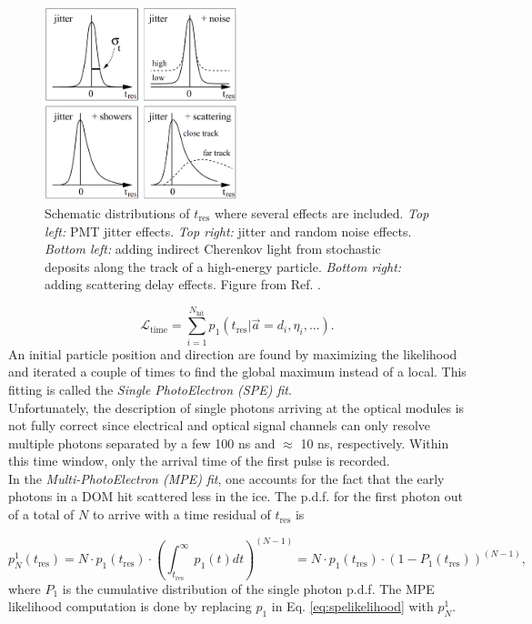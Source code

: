 \begin{figure}[t]
\centering
\includegraphics[width=0.5\textwidth]{chapter7/img/spempejitter.png}
\caption{Schematic distributions of $t_\textrm{res}$ where several effects are included. \textit{Top left: }PMT jitter effects. \textit{Top right: }jitter and random noise effects. \textit{Bottom left: }adding indirect Cherenkov light from stochastic deposits along the track of a high-energy particle. \textit{Bottom right: }adding scattering delay effects. Figure from Ref. \cite{Ahrens:2003fg}.}
\end{figure}

\begin{equation}
\label{eq:spelikelihood}
\mathcal{L}_\textrm{time} = \sum^{N_\textrm{hit}}_{i=1} p_1 (t_\textrm{res} | \vec{a} = {d_i,\eta_i,...}).
\end{equation}
\noindent An initial particle position and direction are found by maximizing the likelihood and iterated a couple of times to find the global maximum instead of a local. This fitting is called the \textit{Single PhotoElectron (SPE) fit}.\\

\noindent Unfortunately, the description of single photons arriving at the optical modules is not fully correct since electrical and optical signal channels can only resolve multiple photons separated by a few 100 ns and $\approx$ 10 ns, respectively. Within this time window, only the arrival time of the first pulse is recorded.\\

\noindent In the \textit{Multi-PhotoElectron (MPE) fit}, one accounts for the fact that the early photons in a DOM hit scattered less in the ice. The p.d.f. for the first photon out of a total of $N$ to arrive with a time residual of $t_\textrm{res}$ is

\begin{equation}
p^1_N (t_\textrm{res}) = N \cdot p_1(t_\textrm{res}) \cdot \left(\int^\infty_{t_\textrm{res}} p_1(t) dt \right)^{(N-1)} = N \cdot p_1 (t_\textrm{res}) \cdot (1-P_1 (t_\textrm{res}))^{(N-1)},
\end{equation}
\noindent where $P_1$ is the cumulative distribution of the single photon p.d.f. The MPE likelihood computation is done by replacing $p_1$ in Eq. \ref{eq:spelikelihood} with $p^1_N$.

